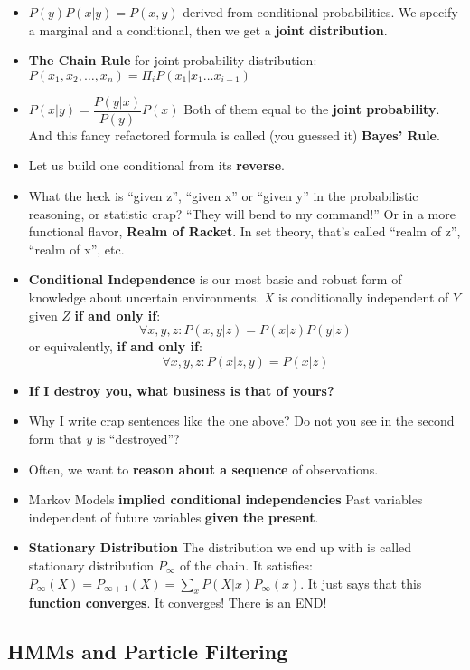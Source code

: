 \documentclass[twocolumn]{article}
\begin{document}
\begin{itemize}
\item $P(y)P(x|y)=P(x,y)$ derived from conditional probabilities. We
  specify a marginal and a conditional, then we get a \textbf{joint
    distribution}.
\item \textbf{The Chain Rule} for joint probability distribution:
  $P(x_{1},x_{2},\ldots,x_{n})=\Pi_{i}P(x_{1}|x_{1}\ldots x_{i-1})$
\item $P(x|y)=\dfrac{P(y|x)}{P(y)}P(x)$ Both of them equal to the
  \textbf{joint probability}. And this fancy refactored formula is
  called (you guessed it) \textbf{Bayes' Rule}.
\item Let us build one conditional from its \textbf{reverse}.
\item What the heck is ``given z'', ``given x'' or ``given y'' in the
  probabilistic reasoning, or statistic crap? ``They will bend to my
  command!'' Or in a more functional flavor, \textbf{Realm of
    Racket}. In set theory, that's called ``realm of z'', ``realm of
  x'', etc.
\item \textbf{Conditional Independence} is our most basic and robust
  form of knowledge about uncertain environments. $X$ is conditionally
  independent of $Y$ given $Z$ \textbf{if and only if}:
  $$ \forall x,y,z: P(x,y|z)=P(x|z)P(y|z)$$ or equivalently,
  \textbf{if and only if}:
  $$\forall x,y,z:P(x|z,y)=P(x|z)$$
\item {\color{red}\textbf{If I destroy you, what business is that of
      yours?}}
\item Why I write  crap sentences like the one above? Do not you see
  in the second form that $y$ is ``destroyed''?
\item Often, we want to \textbf{reason about a sequence} of
  observations. 
\item Markov Models \textbf{implied conditional independencies} Past
  variables independent of future variables \textbf{given the
    present}.
\item \textbf{Stationary Distribution} The distribution we end up with
  is called stationary distribution $P_{\infty}$ of the chain. It
  satisfies:
  $P_{\infty}(X)=P_{\infty+1}(X)=\sum_{x}P(X|x)P_{\infty}(x)$. It just
  says that this \textbf{function converges}. It converges! There is
  an END!\@
\end{itemize}


\subsection{HMMs and Particle Filtering}
\label{sec:hmms-part-filt}
\end{document}

